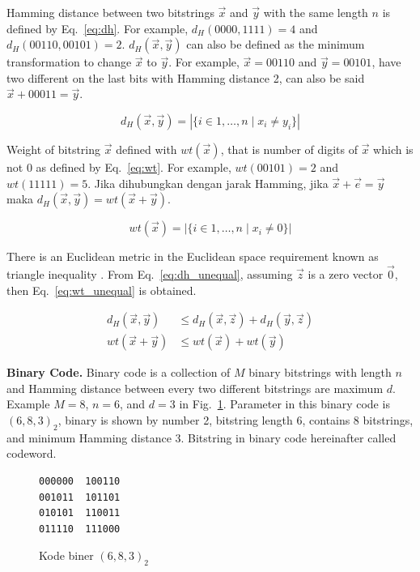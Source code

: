 \documentclass[conference,compsoc]{IEEEtran}
\begin{document}
Hamming distance between two bitstrings $\vec{x}$ and $\vec{y}$ with the same length $n$ is defined by Eq.~\ref{eq:dh}. For example, $d_H(0000,1111)= 4$ and $d_H(00110,00101)= 2$. $d_H(\vec{x},\vec{y})$ can also be defined as the minimum transformation to change $\vec{x}$ to $\vec{y}$. For example, $\vec{x}=00110$ and $\vec{y}=00101$, have two different on the last bits with Hamming distance 2, can also be said $\vec{x}+00011 = \vec{y}$.

\begin{equation} \label{eq:dh}
d_H(\vec{x},\vec{y}) = |\{i \in {1,\ldots,n} \mid x_i \neq y_i\}|
\end{equation}

Weight of bitstring $\vec{x}$ defined with $wt(\vec{x})$, that is number of digits of $\vec{x}$ which is not $0$ as defined by Eq.~\ref{eq:wt}. For example, $wt(00101) = 2$ and $wt(11111) = 5$. Jika dihubungkan dengan jarak Hamming, jika $\vec{x}+\vec{e} = \vec{y}$ maka $d_H(\vec{x},\vec{y}) = wt(\vec{x}+\vec{y})$.

\begin{equation} \label{eq:wt}
wt(\vec{x}) = |\{i \in {1,\ldots,n} \mid x_i \neq 0\}|
\end{equation}

There is an Euclidean metric in the Euclidean space requirement known as triangle inequality \cite{VanLint2016}. From Eq.~\ref{eq:dh_unequal}, assuming $\vec{z}$ is a zero vector $\vec{0}$, then Eq.~\ref{eq:wt_unequal} is obtained.

\begin{align}
d_H(\vec{x},\vec{y}) &\le d_H(\vec{x},\vec{z}) + d_H(\vec{y},\vec{z}) \label{eq:dh_unequal} \\
wt(\vec{x}+\vec{y}) &\le wt(\vec{x}) + wt(\vec{y}) \label{eq:wt_unequal}
\end{align}


\noindent \textbf{Binary Code.}
Binary code is a collection of $M$ binary bitstrings with length $n$ and Hamming distance between every two different bitstrings are maximum $d$. Example $M=8$, $n=6$, and $d=3$ in Fig.~\ref{fig:binarycode683}. Parameter in this binary code is $(6,8,3)_2$, binary is shown by number 2, bitstring length 6, contains 8 bitstrings, and minimum Hamming distance 3. Bitstring in binary code hereinafter called codeword.

\begin{figure}
\centering
\begin{BVerbatim}
000000  100110
001011  101101
010101  110011
011110  111000
\end{BVerbatim}
\caption{Kode biner $(6,8,3)_2$}
\label{fig:binarycode683}
\end{figure}
\end{document}
